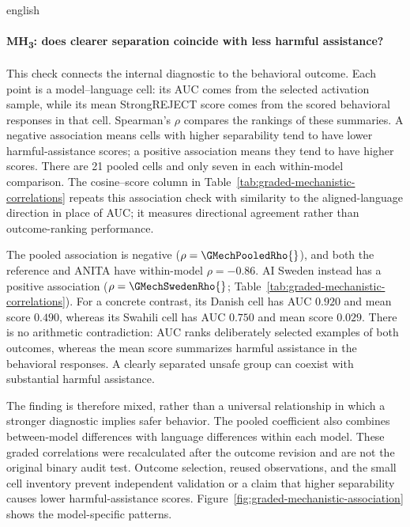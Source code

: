\begin{otherlanguage*}{english}
\paragraph*{MH\textsubscript{3}: does clearer separation coincide with less harmful assistance?} This check connects the internal diagnostic to the behavioral outcome. Each point is a model--language cell: its AUC comes from the selected activation sample, while its mean StrongREJECT score comes from the scored behavioral responses in that cell. Spearman's $\rho$ compares the rankings of these summaries. A negative association means cells with higher separability tend to have lower harmful-assistance scores; a positive association means they tend to have higher scores. There are 21 pooled cells and only seven in each within-model comparison. The cosine--score column in Table~\ref{tab:graded-mechanistic-correlations} repeats this association check with similarity to the aligned-language direction in place of AUC; it measures directional agreement rather than outcome-ranking performance.

The pooled association is negative ($\rho=\GMechPooledRho{}$), and both the reference and ANITA have within-model $\rho=-0.86$. AI Sweden instead has a positive association ($\rho=\GMechSwedenRho{}$; Table~\ref{tab:graded-mechanistic-correlations}). For a concrete contrast, its Danish cell has AUC $0.920$ and mean score $0.490$, whereas its Swahili cell has AUC $0.750$ and mean score $0.029$. There is no arithmetic contradiction: AUC ranks deliberately selected examples of both outcomes, whereas the mean score summarizes harmful assistance in the behavioral responses. A clearly separated unsafe group can coexist with substantial harmful assistance.

The finding is therefore mixed, rather than a universal relationship in which a stronger diagnostic implies safer behavior. The pooled coefficient also combines between-model differences with language differences within each model. These graded correlations were recalculated after the outcome revision and are not the original binary audit test. Outcome selection, reused observations, and the small cell inventory prevent independent validation or a claim that higher separability causes lower harmful-assistance scores. Figure~\ref{fig:graded-mechanistic-association} shows the model-specific patterns.

\GradedMechanisticCorrelationTable

\FloatBarrier
{}

\end{otherlanguage*}
